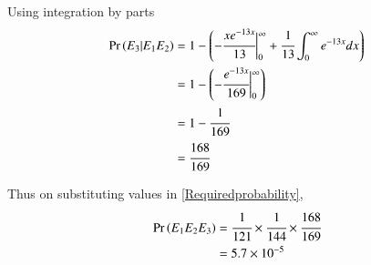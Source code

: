 \documentclass[journal,12pt,twocolumn]{IEEEtran}
\begin{document}
Using integration by parts
\begin{align}
    \Pr\left(E_3|E_1E_2\right) &= 1 -\left( -\cfrac{xe^{-13x}}{13} \biggr \vert_0^{\infty} 
                       + \cfrac{1}{13} \int_0^{\infty}e^{-13x}dx\right)\\
                    &= 1 - \left( -\cfrac{e^{-13x}}{169}\biggr \vert_0^{\infty}\right)\\
                    &= 1 - \cfrac{1}{169}\\
                    &= \cfrac{168}{169}
\end{align}

Thus on substituting values in \eqref{Requiredprobability}, 
\begin{align}
    \Pr\left(E_1E_2E_3\right) &= \cfrac{1}{121}\times \cfrac{1}{144}\times \cfrac{168}{169}\\
                   &= 5.7 \times 10^{-5}
\end{align}
\end{document}
